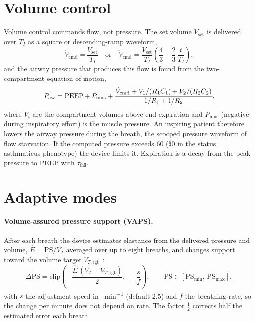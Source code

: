 \section{Volume control}
\label{sec:modes-vc}
Volume control commands flow, not pressure. The set volume $V_{\mathrm{set}}$ is delivered over $T_I$ as a square or descending-ramp waveform,
\begin{equation}
\dot V_{\mathrm{cmd}} = \frac{V_{\mathrm{set}}}{T_I}\quad\text{or}\quad \dot V_{\mathrm{cmd}} = \frac{V_{\mathrm{set}}}{T_I}\left(\frac43 - \frac23\,\frac{t}{T_I}\right),
\label{eq:modes-vc}
\end{equation}
and the airway pressure that produces this flow is found from the two-compartment equation of motion,
\begin{equation}
P_{\mathrm{aw}} = \mathrm{PEEP} + P_{\mathrm{mus}} + \frac{\dot V_{\mathrm{cmd}} + V_1/(R_1C_1) + V_2/(R_2C_2)}{1/R_1 + 1/R_2},
\label{eq:modes-vcp}
\end{equation}
where $V_i$ are the compartment volumes above end-expiration and $P_{\mathrm{mus}}$ (negative during inspiratory effort) is the muscle pressure. An inspiring patient therefore lowers the airway pressure during the breath, the scooped pressure waveform of flow starvation. If the computed pressure exceeds \SI{60}{\cmH} (\SI{90}{\cmH} in the status asthmaticus phenotype) the device limits it. Expiration is a decay from the peak pressure to PEEP with $\tau_{\mathrm{fall}}$.

\section{Adaptive modes}
\label{sec:modes-adapt}
\label{sec:modes-adaptive}
\paragraph{Volume-assured pressure support (VAPS).} After each breath the device estimates elastance from the delivered pressure and volume, $\hat E = \overline{\mathrm{PS}/V_T}$ averaged over up to eight breaths, and changes support toward the volume target $V_{T,\mathrm{tgt}}$~\citep{storre2006}:
\begin{equation}
\Delta\mathrm{PS} = \mathrm{clip}\!\left(-\frac{\hat E\,(V_T - V_{T,\mathrm{tgt}})}{2},\;\pm\frac{s}{f}\right),\qquad
\mathrm{PS} \in [\mathrm{PS_{min}},\,\mathrm{PS_{max}}],
\label{eq:modes-vaps}
\end{equation}
with $s$ the adjustment speed in \si{\cmH\per\minute} (default 2.5) and $f$ the breathing rate, so the change per minute does not depend on rate. The factor $\tfrac12$ corrects half the estimated error each breath.


